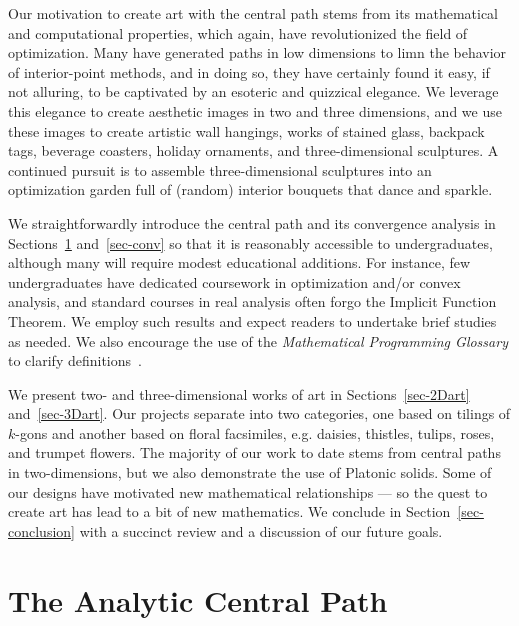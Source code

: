 \documentclass{article}
\begin{document}
Our motivation to create art with the central path stems from its 
mathematical and computational properties, which again, have revolutionized the 
field of optimization. Many have generated paths in low dimensions to limn the 
behavior of interior-point methods, and in doing so, they have certainly
found it easy, if not alluring, to be captivated by an esoteric and 
quizzical elegance. We leverage this elegance to create aesthetic images 
in two and three dimensions, and we use these images to create artistic
wall hangings, works of stained glass, backpack tags, beverage coasters, 
holiday ornaments, and three-dimensional sculptures. A continued pursuit is
to assemble three-dimensional sculptures into an optimization garden full 
of (random) interior bouquets that dance and sparkle.

We straightforwardly introduce the central path and its convergence analysis
in Sections~\ref{sec-acp} and~\ref{sec-conv} so
that it is reasonably accessible to undergraduates, although many
will require modest educational additions. For instance, 
few undergraduates have dedicated coursework in optimization 
and/or convex analysis, and standard courses in real analysis often forgo 
the Implicit Function Theorem. We employ such results and expect readers to 
undertake brief studies as needed. We also encourage the use of the 
{\em Mathematical Programming Glossary} to clarify definitions~\cite{mpg}.

We present two- and three-dimensional works of art in 
Sections~\ref{sec-2Dart} and~\ref{sec-3Dart}. Our projects separate
into two categories, one based on tilings of $k$-gons and another
based on floral facsimiles, e.g. daisies, thistles, tulips, roses, and trumpet 
flowers. The majority of our work to date stems from central paths in two-dimensions,
but we also demonstrate the use of Platonic solids. Some of our designs have
motivated new mathematical relationships --- so the quest to create art has lead to
a bit of new mathematics. We conclude in Section~\ref{sec-conclusion} with a succinct 
review and a discussion of our future goals.

\section{The Analytic Central Path} \label{sec-acp}
\end{document}
